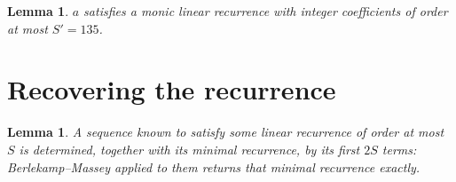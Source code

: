 \documentclass[11pt,a4paper]{article}
\theoremstyle{plain}
\newtheorem{lemma}[theorem]{Lemma}
\theoremstyle{definition}
\begin{document}
\begin{lemma}\label{lem:cf}
$a$ satisfies a monic linear recurrence with integer coefficients of order at most
$S'=135$.
\end{lemma}

\section{Recovering the recurrence}

\begin{lemma}\label{lem:bm}
A sequence known to satisfy some linear recurrence of order at most $S$ is determined, together
with its minimal recurrence, by its first $2S$ terms: Berlekamp--Massey applied to them returns
that minimal recurrence exactly.
\end{lemma}
\end{document}
